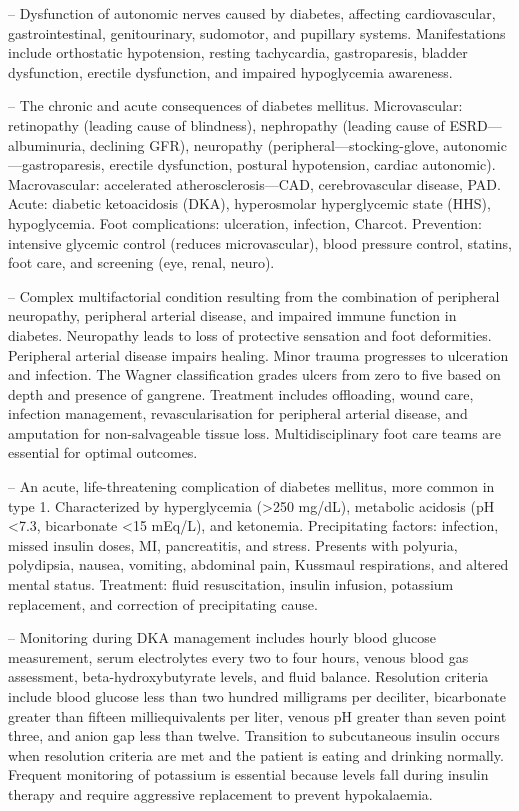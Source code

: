 -- Dysfunction of autonomic nerves caused by diabetes, affecting cardiovascular, gastrointestinal, genitourinary, sudomotor, and pupillary systems. Manifestations include orthostatic hypotension, resting tachycardia, gastroparesis, bladder dysfunction, erectile dysfunction, and impaired hypoglycemia awareness.

-- The chronic and acute consequences of diabetes mellitus. Microvascular: retinopathy (leading cause of blindness), nephropathy (leading cause of ESRD—albuminuria, declining GFR), neuropathy (peripheral—stocking-glove, autonomic—gastroparesis, erectile dysfunction, postural hypotension, cardiac autonomic). Macrovascular: accelerated atherosclerosis—CAD, cerebrovascular disease, PAD. Acute: diabetic ketoacidosis (DKA), hyperosmolar hyperglycemic state (HHS), hypoglycemia. Foot complications: ulceration, infection, Charcot. Prevention: intensive glycemic control (reduces microvascular), blood pressure control, statins, foot care, and screening (eye, renal, neuro).

-- Complex multifactorial condition resulting from the combination of peripheral neuropathy, peripheral arterial disease, and impaired immune function in diabetes. Neuropathy leads to loss of protective sensation and foot deformities. Peripheral arterial disease impairs healing. Minor trauma progresses to ulceration and infection. The Wagner classification grades ulcers from zero to five based on depth and presence of gangrene. Treatment includes offloading, wound care, infection management, revascularisation for peripheral arterial disease, and amputation for non-salvageable tissue loss. Multidisciplinary foot care teams are essential for optimal outcomes.

-- An acute, life-threatening complication of diabetes mellitus, more common in type 1. Characterized by hyperglycemia (>250 mg/dL), metabolic acidosis (pH <7.3, bicarbonate <15 mEq/L), and ketonemia. Precipitating factors: infection, missed insulin doses, MI, pancreatitis, and stress. Presents with polyuria, polydipsia, nausea, vomiting, abdominal pain, Kussmaul respirations, and altered mental status. Treatment: fluid resuscitation, insulin infusion, potassium replacement, and correction of precipitating cause.

-- Monitoring during DKA management includes hourly blood glucose measurement, serum electrolytes every two to four hours, venous blood gas assessment, beta-hydroxybutyrate levels, and fluid balance. Resolution criteria include blood glucose less than two hundred milligrams per deciliter, bicarbonate greater than fifteen milliequivalents per liter, venous pH greater than seven point three, and anion gap less than twelve. Transition to subcutaneous insulin occurs when resolution criteria are met and the patient is eating and drinking normally. Frequent monitoring of potassium is essential because levels fall during insulin therapy and require aggressive replacement to prevent hypokalaemia.

